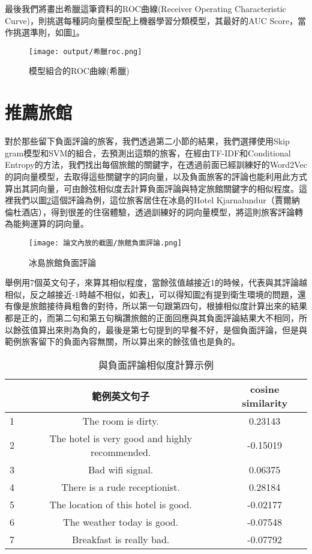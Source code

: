 	最後我們將畫出希臘這筆資料的ROC曲線(Receiver Operating Characteristic Curve)，則挑選每種詞向量模型配上機器學習分類模型，其最好的AUC Score，當作挑選準則，如圖\ref{Fig8}。\\
	
	\begin{figure}[H]
	\centering
	\texttt{[image: output/希臘roc.png]}
	\caption{模型組合的ROC曲線(希臘)}
	\label{Fig8}
	\end{figure}

\newpage

\section{推薦旅館}

	對於那些留下負面評論的旅客，我們透過第二小節的結果，我們選擇使用Skip gram模型和SVM的組合，去預測出這類的旅客，在經由TF-IDF和Conditional Entropy的方法，我們找出每個旅館的關鍵字，在透過前面已經訓練好的Word2Vec的詞向量模型，去取得這些關鍵字的詞向量，以及負面旅客的評論也能利用此方式算出其詞向量，可由餘弦相似度去計算負面評論與特定旅館關鍵字的相似程度。這裡我們以圖\ref{Fig9}這個評論為例，這位旅客居住在冰島的Hotel Kjarnalundur（賈爾納倫杜酒店），得到很差的住宿體驗，透過訓練好的詞向量模型，將這則旅客評論轉為能夠運算的詞向量。\\
	
	\begin{figure}[H]
	\centering
	\texttt{[image: 論文內放的截圖/旅館負面評論.png]}
	\caption{冰島旅館負面評論}
	\label{Fig9}
	\end{figure}

\newpage
	
\noindent 舉例用7個英文句子，來算其相似程度，當餘弦值越接近1的時候，代表與其評論越相似，反之越接近-1時越不相似，如表\ref{tab9}，可以得知圖\ref{Fig9}有提到衛生環境的問題，還有像是旅館接待員粗魯的對待，所以第一句跟第四句，根據相似度計算出來的結果都是正的，而第二句和第五句稱讚旅館的正面回應與其負面評論結果大不相同，所以餘弦值算出來則為負的，最後是第七句提到的早餐不好，是個負面評論，但是與範例旅客留下的負面內容無關，所以算出來的餘弦值也是負的。
	
	\begin{table}[H]
	\centering
	\caption{與負面評論相似度計算示例}
	\begin{tabular}{|c|c|c|}
	\toprule
	& 範例英文句子 & cosine similarity \\
	\midrule
	1 & The room is dirty. & 0.23143  \\
	\midrule
	2 & The hotel is very good and highly recommended. & -0.15019 \\
	\midrule
	3 & Bad wifi signal. & 0.06375  \\
	\midrule
	4 & There is a rude receptionist. & 0.28184 \\
	\midrule
	5 & The location of this hotel is good. & -0.02177\\
	\midrule
	6 & The weather today is good. & -0.07548 \\
	\midrule
	7 & Breakfast is really bad. & -0.07792 \\
	\bottomrule
	\end{tabular}
	\label{tab9}
	\end{table}

